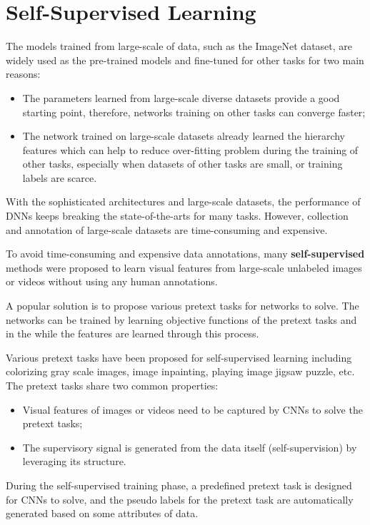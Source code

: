 \chapter{Self-Supervised Learning}
The models trained from large-scale of data, such as the ImageNet dataset, are
widely used as the pre-trained models and fine-tuned for other tasks for two main
reasons:
\begin{itemize}
      \item The parameters learned from large-scale diverse datasets provide a good
            starting point, therefore, networks training on other tasks can converge
            faster;
      \item The network trained on large-scale datasets already learned the hierarchy
            features which can help to reduce over-fitting problem during the training of
            other tasks, especially when datasets of other tasks are small, or training
            labels are scarce.
\end{itemize}

With the sophisticated architectures and large-scale datasets, the performance
of DNNs keeps breaking the state-of-the-arts for many tasks. However, collection
and annotation of large-scale datasets are time-consuming and expensive.

To avoid time-consuming and expensive data annotations, many \textbf{self-supervised}
methods were proposed to learn visual features from large-scale unlabeled images
or videos without using any human annotations.

A popular solution is to propose various pretext tasks for networks to solve. The
networks can be trained by learning objective functions of the pretext tasks and
in the while the features are learned through this process.

Various pretext tasks have been proposed for self-supervised learning including
colorizing gray scale images, image inpainting, playing image jigsaw puzzle, etc.
The pretext tasks share two common properties:

\begin{itemize}
      \item Visual features of images or videos need to be captured by CNNs to solve
            the pretext tasks;
      \item The supervisory signal is generated from the data itself (self-supervision)
            by leveraging its structure.
\end{itemize}

During the self-supervised training phase, a predefined pretext task is designed
for CNNs to solve, and the pseudo labels for the pretext task are automatically
generated based on some attributes of data.

